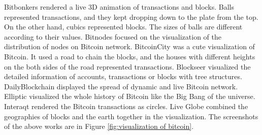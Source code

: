 Bitbonkers \cite{bitbonkers} rendered a live 3D animation of transactions and blocks. Balls represented transactions, and they kept dropping down to the plate from the top. On the other hand, cubics represented blocks. The sizes of balls are different according to their values. Bitnodes \cite{bitnodes} focused on the visualization of the distribution of nodes on Bitcoin network. BitcoinCity \cite{bitcoincity} was a cute visualization of Bitcoin. It used a road to chain the blocks, and the houses with different heights on the both sides of the road represented transactions. Blockseer \cite{blockseer} visualized the detailed information of accounts, transactions or blocks with tree structures. DailyBlockchain \cite{dailyblockchain} displayed the spread of dynamic and live Bitcoin network. Elliptic \cite{elliptic} visualized the whole history of Bitcoin like the Big Bang of the universe. Interaqt \cite{interaqt} rendered the Bitcoin transactions as circles. Live Globe \cite{liveglobe} combined the geographies of blocks and the earth together in the visualization. The screenshots of the above works are in Figure \ref{fig:visualization of bitcoin}.

